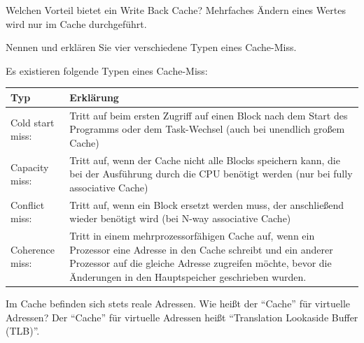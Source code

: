 {
  Welchen Vorteil bietet ein Write Back Cache?
}
{
  Mehrfaches Ändern eines Wertes wird nur im Cache durchgeführt.
}

{
  Nennen und erklären Sie vier verschiedene Typen eines Cache-Miss.
}
{
  Es existieren folgende Typen eines Cache-Miss:\\
  \begin{tabularx}{\textwidth}{|l|X|}
    \toprule
    Typ              & Erklärung                                                                                                                                          \\
    \midrule
    Cold start miss: & Tritt auf beim ersten Zugriff auf einen Block nach dem Start des Programms oder dem Task-Wechsel (auch bei unendlich großem Cache)                 \\
    \midrule
    Capacity miss:   & Tritt auf, wenn der Cache nicht alle Blocks speichern kann, die bei der Ausführung durch die CPU benötigt werden (nur bei fully associative Cache) \\
    \midrule
    Conflict miss:   & Tritt auf, wenn ein Block ersetzt werden muss, der anschließend wieder benötigt wird (bei N-way associative Cache)                                 \\
    \midrule
    Coherence miss:  & Tritt in einem mehrprozessorfähigen Cache auf,
    wenn ein Prozessor eine Adresse in den Cache schreibt und ein anderer Prozessor auf die gleiche Adresse zugreifen möchte,
    bevor die Änderungen in den Hauptspeicher geschrieben wurden.                                                                                                         \\
    \bottomrule
  \end{tabularx}
}

{
  Im Cache befinden sich stets reale Adressen.
  Wie heißt der \enquote{Cache} für virtuelle Adressen?
}
{
  Der \enquote{Cache} für virtuelle Adressen heißt \enquote{Translation Lookaside Buffer (TLB)}.
}

